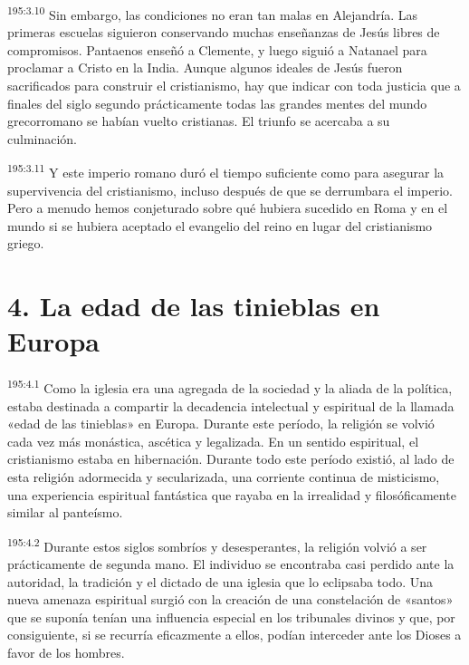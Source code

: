 \par 
\textsuperscript{195:3.10} Sin embargo, las condiciones no eran tan malas en Alejandría. Las primeras escuelas siguieron conservando muchas enseñanzas de Jesús libres de compromisos. Pantaenos enseñó a Clemente, y luego siguió a Natanael para proclamar a Cristo en la India. Aunque algunos ideales de Jesús fueron sacrificados para construir el cristianismo, hay que indicar con toda justicia que a finales del siglo segundo prácticamente todas las grandes mentes del mundo grecorromano se habían vuelto cristianas. El triunfo se acercaba a su culminación.

\par 
\textsuperscript{195:3.11} Y este imperio romano duró el tiempo suficiente como para asegurar la supervivencia del cristianismo, incluso después de que se derrumbara el imperio. Pero a menudo hemos conjeturado sobre qué hubiera sucedido en Roma y en el mundo si se hubiera aceptado el evangelio del reino en lugar del cristianismo griego.

\section*{4. La edad de las tinieblas en Europa}
\par 
\textsuperscript{195:4.1} Como la iglesia era una agregada de la sociedad y la aliada de la política, estaba destinada a compartir la decadencia intelectual y espiritual de la llamada «edad de las tinieblas» en Europa. Durante este período, la religión se volvió cada vez más monástica, ascética y legalizada. En un sentido espiritual, el cristianismo estaba en hibernación. Durante todo este período existió, al lado de esta religión adormecida y secularizada, una corriente continua de misticismo, una experiencia espiritual fantástica que rayaba en la irrealidad y filosóficamente similar al panteísmo.

\par 
\textsuperscript{195:4.2} Durante estos siglos sombríos y desesperantes, la religión volvió a ser prácticamente de segunda mano. El individuo se encontraba casi perdido ante la autoridad, la tradición y el dictado de una iglesia que lo eclipsaba todo. Una nueva amenaza espiritual surgió con la creación de una constelación de «santos» que se suponía tenían una influencia especial en los tribunales divinos y que, por consiguiente, si se recurría eficazmente a ellos, podían interceder ante los Dioses a favor de los hombres.

